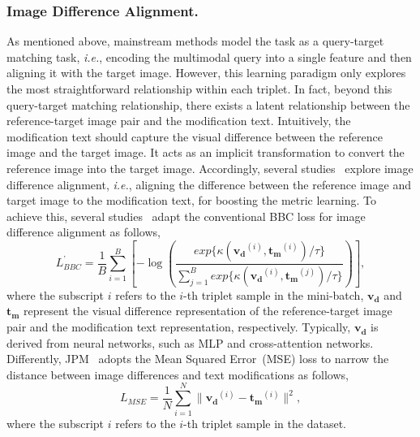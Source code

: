 \subsubsection{Image Difference Alignment.} 
As mentioned above, mainstream methods model the task as a query-target matching task, \textit{i.e.}, encoding the multimodal query into a single feature and then aligning it with the target image. However, this learning paradigm only explores the most straightforward relationship within each triplet. In fact, beyond this query-target matching relationship, there exists a latent relationship between the reference-target image pair and the modification text. Intuitively, the modification text should capture the visual difference between the reference image and the target image. It acts as an implicit transformation to convert the reference image into the target image. Accordingly, several studies~\cite{kim2021dcnet, zhang2021mcr, yang2021jpm,li2023acnet, jiang2024cala} explore image difference alignment, \textit{i.e.}, aligning the difference between the reference image and target image to the modification text, for boosting the metric learning. To achieve this, several studies~\cite{kim2021dcnet, jiang2024cala, li2023acnet} adapt the conventional BBC loss for image difference alignment as follows, 
\begin{equation}
L_{BBC}^{’} = \frac{1}{B} \sum_{i=1}^{B}\left[ -\log \left(\frac {exp\{\kappa(\mathbf{v_d}^{(i)}, \mathbf{t_m}^{(i)}) /\tau \}}{\sum_{j=1}^{B}exp\{\kappa(\mathbf{v_d}^{(i)} , \mathbf{t_m}^{(j)} ) /\tau \}}  \right) \right], 
\label{eq:imagedifferencebbc_loss}
\end{equation}
where the subscript $i$ refers to the $i$-th triplet sample in the mini-batch, ${\mathbf{v_d}}$ and $\mathbf{\mathbf{t_m}}$ represent the visual difference representation of the reference-target image pair and the modification text representation, respectively. Typically, ${\mathbf{v_d}}$ is derived from neural networks, such as MLP and cross-attention networks.
Differently, JPM~\cite{yang2021jpm} adopts the Mean Squared Error~(MSE) loss to narrow the distance between image differences and text modifications as follows,
\begin{equation}
L_{MSE} = \frac{1}{N} \sum_{i=1}^{N} \parallel \mathbf{v_d}^{(i)} - \mathbf{t_m}^{(i)} \parallel ^2,
\label{eq:mse}
\end{equation}
where the subscript $i$ refers to the $i$-th triplet sample in the dataset.
